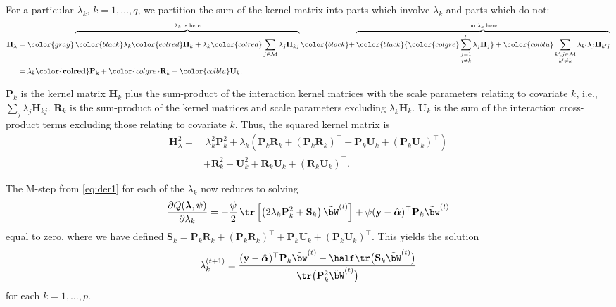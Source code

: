 \documentclass[english, 11pt]{article}
\begin{document}

For a particular $\lambda_k$, $k=1,\dots,q$, we partition the sum of the kernel matrix into parts which involve $\lambda_k$ and parts which do not:
\begin{align}
	\mathbf H_{\lambda} &= {\color{gray}
	\overbrace{\color{black}\lambda_k{\color{colred}\mathbf H_k} + \lambda_k {\color{colred} \sum_{j\in \mathcal M}\lambda_j\mathbf H_{kj}}\vphantom{\mathop{\sum_{j=1}^p}_{j\neq k}}}^{\lambda_k\text{ is here}}
	{\color{black}+}
	\overbrace{\color{black}{\color{colgre}\mathop{\sum_{j=1}^p}_{j\neq k}\lambda_j \mathbf H_j} + {\color{colblu}\mathop{\sum_{k',j \in \mathcal M}}_{k'\neq k}\lambda_{k'}\lambda_j \mathbf H_{k'j}}}^{\text{no $\lambda_k$ here}}
	} \nonumber \\
	&= \lambda_k\mathbf {\color{colred}P_k} + {\color{colgre}\mathbf R_k} + {\color{colblu}\mathbf U_k}.
\end{align}

$\mathbf P_k$ is the kernel matrix $\mathbf H_k$ plus the sum-product of the interaction kernel matrices with the scale parameters relating to covariate $k$, i.e., $\sum_j \lambda_j\mathbf H_{kj}$. $\mathbf R_k$ is the sum-product of the kernel matrices and scale parameters excluding $\lambda_k\mathbf H_k$. $\mathbf U_k$ is the sum of the interaction cross-product terms excluding those relating to covariate $k$. Thus, the squared kernel matrix is
\begin{align}\label{eq:kernpartsq}
		\mathbf H_{\lambda}^2 =& \ \lambda_k^2\mathbf P_k^2  + \lambda_k \left( \mathbf P_k\mathbf R_k + (\mathbf P_k\mathbf R_k)^\top + \mathbf P_k\mathbf U_k + (\mathbf P_k\mathbf U_k)^\top \right) \nonumber \\
		& + \mathbf R_k^2 + \mathbf U_k^2 + \mathbf R_k\mathbf U_k + (\mathbf R_k\mathbf U_k)^\top.
\end{align}

The M-step from \eqref{eq:der1} for each of the $\lambda_k$ now reduces to solving
\[
	\frac{\partial Q(\blam, \psi)}{\partial \lambda_k}
	= - \frac{\psi}{2} \, \tr \left[ \left( 2\lambda_k\mathbf P_k^2 + \mathbf S_k \right)  \tilde{\bW}^{(t)} \right] + \psi(\mathbf y - \hat{\boldsymbol\alpha})^\top \mathbf P_k \tilde{\bw}^{(t)}
\]
equal to zero, where we have defined $\mathbf S_k = \mathbf P_k\mathbf R_k + (\mathbf P_k\mathbf R_k)^\top + \mathbf P_k\mathbf U_k + (\mathbf P_k\mathbf U_k)^\top$. This yields the solution
\[
	\lambda_k^{(t+1)} = \frac{(\mathbf y - \hat{\boldsymbol\alpha})^\top \mathbf P_k \tilde{\bw}^{(t)} - \half \tr \big( \mathbf S_k \tilde{\bW}^{(t)} \big)}{\tr \big( \mathbf P_k^2 \tilde{\bW}^{(t)} \big)}
\]
for each $k = 1,\dots,p$.
\end{document}
